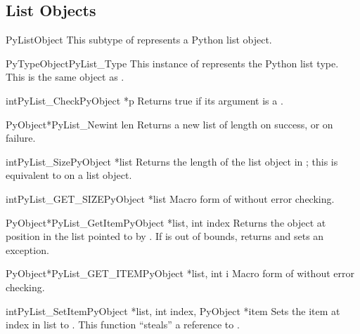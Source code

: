 \documentclass{manual}
\begin{document}
\subsection{List Objects \label{listObjects}}

\begin{ctypedesc}{PyListObject}
This subtype of  represents a Python list object.
\end{ctypedesc}

\begin{cvardesc}{PyTypeObject}{PyList_Type}
This instance of  represents the Python list
type.  This is the same object as .
\end{cvardesc}

\begin{cfuncdesc}{int}{PyList_Check}{PyObject *p}
Returns true if its argument is a .
\end{cfuncdesc}

\begin{cfuncdesc}{PyObject*}{PyList_New}{int len}
Returns a new list of length  on success, or \NULL{} on
failure.
\end{cfuncdesc}

\begin{cfuncdesc}{int}{PyList_Size}{PyObject *list}
Returns the length of the list object in ; this is
equivalent to  on a list object.
\end{cfuncdesc}

\begin{cfuncdesc}{int}{PyList_GET_SIZE}{PyObject *list}
Macro form of  without error checking.
\end{cfuncdesc}

\begin{cfuncdesc}{PyObject*}{PyList_GetItem}{PyObject *list, int index}
Returns the object at position  in the list pointed
to by .  If  is out of bounds, returns \NULL{} and
sets an  exception.
\end{cfuncdesc}

\begin{cfuncdesc}{PyObject*}{PyList_GET_ITEM}{PyObject *list, int i}
Macro form of  without error checking.
\end{cfuncdesc}

\begin{cfuncdesc}{int}{PyList_SetItem}{PyObject *list, int index,
                                       PyObject *item}
Sets the item at index  in list to .
  This function ``steals'' a reference to .
\end{cfuncdesc}
\end{document}
